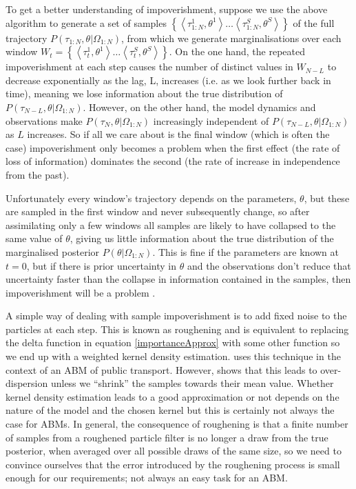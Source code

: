 \documentclass{article}
\begin{document}
To get a better understanding of impoverishment, suppose we use the above algorithm to generate a set of samples $\left\{\left<\tau_{1:N}^1,\theta^1\right> \dots \left<\tau_{1:N}^S,\theta^S\right>\right\}$ of the full trajectory $P(\tau_{1:N},\theta|\Omega_{1:N})$, from which we generate marginalisations over each window $W_t = \left\{\left<\tau_t^1,\theta^1\right> \dots \left<\tau_t^S,\theta^S\right>\right\}$. On the one hand, the repeated impoverishment at each step causes the number of distinct values in $W_{N-L}$ to decrease exponentially as the lag, L, increases (i.e. as we look further back in time), meaning we lose information about the true distribution of $P(\tau_{N-L},\theta|\Omega_{1:N})$. However, on the other hand, the model dynamics and observations make $P(\tau_{N},\theta|\Omega_{1:N})$ increasingly independent of $P(\tau_{N-L},\theta|\Omega_{1:N})$ as $L$ increases. So if all we care about is the final window (which is often the case) impoverishment only becomes a problem when the first effect (the rate of loss of information) dominates the second (the rate of increase in independence from the past).
  
Unfortunately every window's trajectory depends on the parameters, $\theta$, but these are sampled in the first window and never subsequently change, so after assimilating only a few windows all samples are likely to have collapsed to the same value of $\theta$, giving us little information about the true distribution of the marginalised posterior $P(\theta|\Omega_{1:N})$. This is fine if the parameters are known at $t=0$, but if there is prior uncertainty in $\theta$ and the observations don't reduce that uncertainty faster than the collapse in information contained in the samples, then impoverishment will be a problem \citep*{liu2001combined, andrieu2004particle}.

A simple way of dealing with sample impoverishment is to add fixed noise to the particles at each step. This is known as roughening \citep*{gordon1993novel, li2014fight} and is equivalent to replacing the delta function in equation \eqref{importanceApprox} with some other function so we end up with a weighted kernel density estimation. \citet{kieu_dealing_2020} uses this technique in the context of an ABM of public transport. However, \citet{liu2001combined} shows that this leads to over-dispersion unless we ``shrink'' the samples towards their mean value. Whether kernel density estimation leads to a good approximation or not depends on the nature of the model and the chosen kernel but this is certainly not always the case for ABMs. In general, the consequence of roughening is that a finite number of samples from a roughened particle filter is no longer a draw from the true posterior, when averaged over all possible draws of the same size, so we need to convince ourselves that the error introduced by the roughening process is small enough for our requirements; not always an easy task for an ABM.
\end{document}
